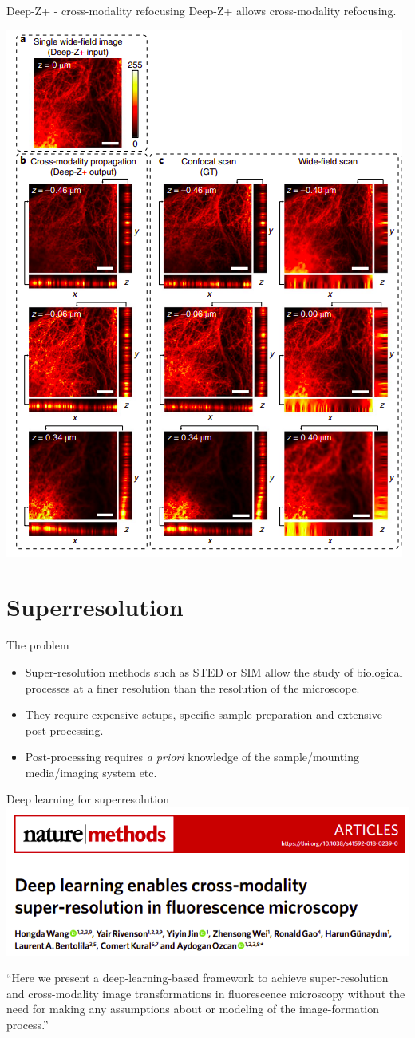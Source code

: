 \documentclass[9pt, aspectratio=169]{beamer}
\begin{document}
\begin{frame}
    {Deep-Z+ - cross-modality refocusing}
    Deep-Z+ allows cross-modality refocusing.

    \centering
    \includegraphics[width=.4\textwidth]{deepzplus.png}
\end{frame}

\section{Superresolution}

\begin{frame}
    {The problem}
    \begin{itemize}
        \item Super-resolution methods such as STED or SIM allow the study of biological processes at a finer resolution than the resolution of the microscope.
        \item They require expensive setups, specific sample preparation and extensive post-processing.
        \item Post-processing requires \textit{a priori} knowledge of the sample/mounting media/imaging system etc.
    \end{itemize}
\end{frame}
\begin{frame}
    {Deep learning for superresolution}
    \centering
    \includegraphics[width=\textwidth]{wang_title.png}

    ``Here we present a deep-learning-based framework to achieve super-resolution and cross-modality image transformations in fluorescence microscopy without the need for making any assumptions about or modeling of the image-formation process.''
\end{frame}
\end{document}

